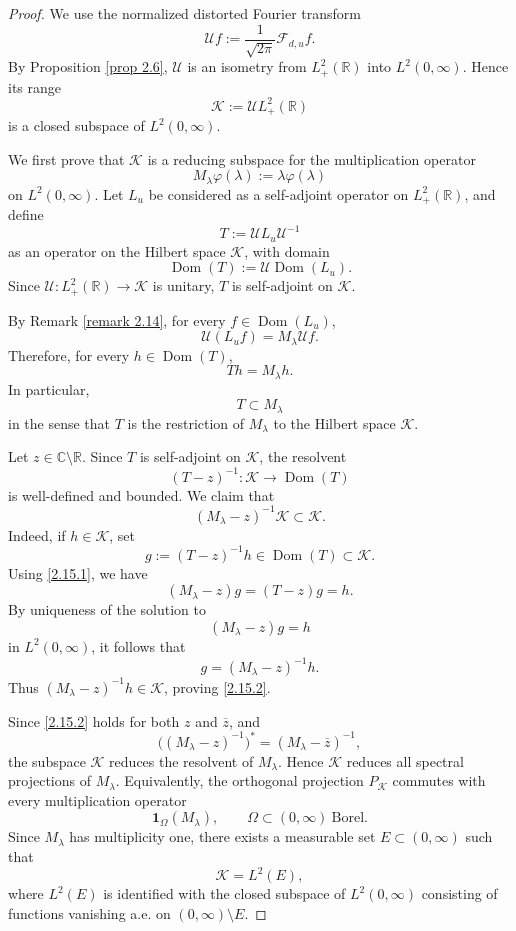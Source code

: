 \documentclass[10pt]{article}
\numberwithin{equation}{section}
\numberwithin{theorem}{section}
\begin{document}
\begin{proof}
We use the normalized distorted Fourier transform
\[
\mathcal U f:=\frac{1}{\sqrt{2\pi}}\mathcal F_{d,u} f .
\]
By Proposition \ref{prop 2.6}, \(\mathcal U\) is an isometry from
\(L^2_+(\mathbb R)\) into \(L^2(0,\infty)\). Hence its range
\[
\mathcal K:=\mathcal U L^2_+(\mathbb R)
\]
is a closed subspace of \(L^2(0,\infty)\).

We first prove that \(\mathcal K\) is a reducing subspace for the multiplication operator
\[
M_\lambda\varphi(\lambda):=\lambda\varphi(\lambda)
\]
on \(L^2(0,\infty)\). Let \(L_u\) be considered as a self-adjoint operator on
\(L^2_+(\mathbb R)\), and define
\[
T:=\mathcal U L_u\mathcal U^{-1}
\]
as an operator on the Hilbert space \(\mathcal K\), with domain
\[
\operatorname{Dom}(T):=\mathcal U\operatorname{Dom}(L_u).
\]
Since \(\mathcal U:L^2_+(\mathbb R)\to\mathcal K\) is unitary, \(T\) is self-adjoint on
\(\mathcal K\).

By Remark \ref{remark 2.14}, for every \(f\in\operatorname{Dom}(L_u)\),
\[
\mathcal U(L_uf)=M_\lambda\mathcal U f.
\]
Therefore, for every \(h\in\operatorname{Dom}(T)\),
\begin{equation}
\label{2.15.1}
Th=M_\lambda h.
\end{equation}
In particular,
\[
T\subset M_\lambda
\]
in the sense that \(T\) is the restriction of \(M_\lambda\) to the Hilbert space
\(\mathcal K\).

Let \(z\in\mathbb C\setminus\mathbb R\). Since \(T\) is self-adjoint on \(\mathcal K\),
the resolvent
\[
(T-z)^{-1}:\mathcal K\to\operatorname{Dom}(T)
\]
is well-defined and bounded. We claim that
\begin{equation}
\label{2.15.2}
(M_\lambda-z)^{-1}\mathcal K\subset\mathcal K.
\end{equation}
Indeed, if \(h\in\mathcal K\), set
\[
g:=(T-z)^{-1}h\in\operatorname{Dom}(T)\subset\mathcal K.
\]
Using \eqref{2.15.1}, we have
\[
(M_\lambda-z)g=(T-z)g=h.
\]
By uniqueness of the solution to
\[
(M_\lambda-z)g=h
\]
in \(L^2(0,\infty)\), it follows that
\[
g=(M_\lambda-z)^{-1}h.
\]
Thus \((M_\lambda-z)^{-1}h\in\mathcal K\), proving \eqref{2.15.2}.

Since \eqref{2.15.2} holds for both \(z\) and \(\overline z\), and
\[
\bigl((M_\lambda-z)^{-1}\bigr)^*
=
(M_\lambda-\overline z)^{-1},
\]
the subspace \(\mathcal K\) reduces the resolvent of \(M_\lambda\). Hence \(\mathcal K\)
reduces all spectral projections of \(M_\lambda\). Equivalently, the orthogonal
projection \(P_{\mathcal K}\) commutes with every multiplication operator
\[
\mathbf 1_\Omega(M_\lambda),
\qquad \Omega\subset(0,\infty)\ \text{Borel}.
\]
Since \(M_\lambda\) has multiplicity one, there exists a measurable set
\(E\subset(0,\infty)\) such that
\begin{equation}
\label{2.15.3}
\mathcal K=L^2(E),
\end{equation}
where \(L^2(E)\) is identified with the closed subspace of \(L^2(0,\infty)\) consisting of
functions vanishing a.e. on \((0,\infty)\setminus E\).


\end{proof}
\end{document}
